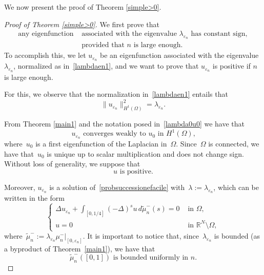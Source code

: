 \documentclass[12pt,a4paper,intlimits,sumlimits]{amsart}
\def \R {\mathbb{R}}
\theoremstyle{definition}
\theoremstyle{plain}
\numberwithin{equation}{section}
\begin{document}
We now present the proof of Theorem \ref{simple>0}.

\begin{proof}[Proof of Theorem \ref{simple>0}]
We first prove that
\begin{equation}\label{claimpositivo}
\begin{aligned}
\mbox{any eigenfunction}&\mbox{ associated
with the eigenvalue $\lambda_{\varepsilon_n}$ has constant sign}, \\
&\mbox{ provided that $n$ is large enough.}
\end{aligned}
\end{equation}
To accomplish this, we let $u_{\varepsilon_n}$ be an eigenfunction associated
with the eigenvalue $\lambda_{\varepsilon_n}$, normalized as in~\eqref{lambdaen1},
and we want to prove that $u_{\varepsilon_n}$ is positive if $n$ is large enough.

For this, we observe that the normalization in~\eqref{lambdaen1} entails
that
\begin{equation}\label{02eikdfv.1w2erfegrv8x82-pe}
\|u_{\varepsilon_n}\|^2_{H^1(\Omega)}=\lambda_{\varepsilon_n}.
\end{equation}

From Theorem \ref{main1} and the notation posed in~\eqref{lambda0u0}
we have that 
\begin{equation}\label{02eikdfv.1w2erfegrv8x82-pe.2erfgngKK}
{\mbox{$u_{\varepsilon_n}$ converges 
weakly to $u_0$ in $H^1(\Omega)$,}}\end{equation} where~$u_0$
is a first eigenfunction of the Laplacian in~$\Omega$.
Since~$\Omega$ is connected, we have that~$u_0$
is unique up to scalar multiplication and does not change sign.
Without loss of generality, we suppose that
\begin{equation}\label{AKLPS-1we2dPKJH}
{\mbox{$u$ is positive.}}
\end{equation}

Moreover, $u_{\varepsilon_n}$ is a solution
of~\eqref{probsuccessionefacile} with~$\lambda:=\lambda_{\varepsilon_n}$,
which can be written in the form
\begin{equation}\label{v4d0qwieejpr.12e0rfeprg}
\begin{cases}
\displaystyle \Delta u_{\varepsilon_n}+ \int_{[0, 1/4]} (-\Delta)^s u\, d\widetilde\mu_n^-(s)  =0&  \mbox{ in } \Omega,
\\
u=0    &  \mbox{ in } \R^N \setminus \Omega,
\end{cases}
\end{equation}where~$\widetilde\mu_n^-:=\lambda_{\varepsilon_n}\mu_n^-\big|_{[0,\varepsilon_n]}$.
It is important to notice that, since~$\lambda_{\varepsilon_n}$
is bounded (as a byproduct of Theorem~\ref{main1}),
we have that
\begin{equation}\label{v4d0qwieejpr.12e0rfeprg02}
{\mbox{$\widetilde\mu_n^-([0,1])$ is bounded uniformly in~$n$.}}
\end{equation}


\end{proof}
\end{document}
